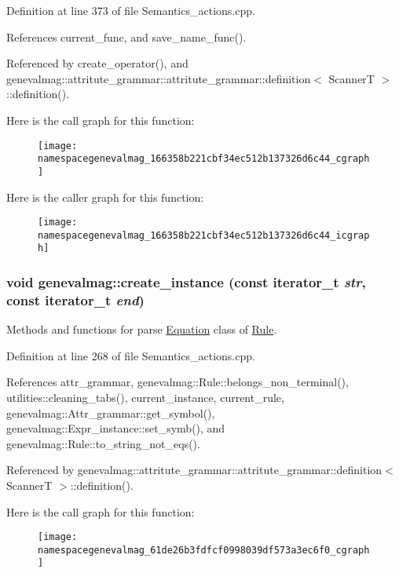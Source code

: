 Definition at line 373 of file Semantics\_\-actions.cpp.

References current\_\-func, and save\_\-name\_\-func().

Referenced by create\_\-operator(), and genevalmag::attritute\_\-grammar::attritute\_\-grammar::definition$<$ ScannerT $>$::definition().

Here is the call graph for this function:\nopagebreak
\begin{figure}[H]
\begin{center}
\leavevmode
\texttt{[image: namespacegenevalmag\_166358b221cbf34ec512b137326d6c44\_cgraph]}
\end{center}
\end{figure}


Here is the caller graph for this function:\nopagebreak
\begin{figure}[H]
\begin{center}
\leavevmode
\texttt{[image: namespacegenevalmag\_166358b221cbf34ec512b137326d6c44\_icgraph]}
\end{center}
\end{figure}
\hypertarget{namespacegenevalmag_61de26b3fdfcf0998039df573a3ec6f0}{
\subsubsection[{create\_\-instance}]{\setlength{\rightskip}{0pt plus 5cm}void genevalmag::create\_\-instance (const iterator\_\-t {\em str}, \/  const iterator\_\-t {\em end})}}
\label{namespacegenevalmag_61de26b3fdfcf0998039df573a3ec6f0}


Methods and functions for parse \hyperlink{classgenevalmag_1_1Equation}{Equation} class of \hyperlink{classgenevalmag_1_1Rule}{Rule}. 

Definition at line 268 of file Semantics\_\-actions.cpp.

References attr\_\-grammar, genevalmag::Rule::belongs\_\-non\_\-terminal(), utilities::cleaning\_\-tabs(), current\_\-instance, current\_\-rule, genevalmag::Attr\_\-grammar::get\_\-symbol(), genevalmag::Expr\_\-instance::set\_\-symb(), and genevalmag::Rule::to\_\-string\_\-not\_\-eqs().

Referenced by genevalmag::attritute\_\-grammar::attritute\_\-grammar::definition$<$ ScannerT $>$::definition().

Here is the call graph for this function:\nopagebreak
\begin{figure}[H]
\begin{center}
\leavevmode
\texttt{[image: namespacegenevalmag\_61de26b3fdfcf0998039df573a3ec6f0\_cgraph]}
\end{center}
\end{figure}


